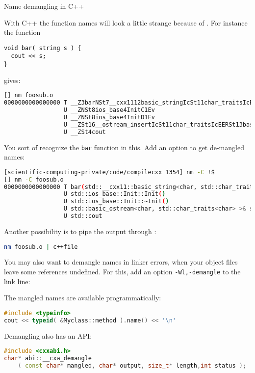  {Name demangling in C++}

With C++ the function names will look a little strange
because of .
For instance the function
\begin{lstlisting}
void bar( string s ) {
  cout << s;
}
\end{lstlisting}
gives:
\begin{lstlisting}[language=bash]
[] nm foosub.o
0000000000000000 T __Z3barNSt7__cxx1112basic_stringIcSt11char_traitsIcESaIcEEE
                 U __ZNSt8ios_base4InitC1Ev
                 U __ZNSt8ios_base4InitD1Ev
                 U __ZSt16__ostream_insertIcSt11char_traitsIcEERSt13basic_ostreamIT_T0_ES6_PKS3_l
                 U __ZSt4cout
\end{lstlisting}
You sort of recognize the \lstinline{bar} function in this.
Add an option  to get de-mangled names:
\begin{lstlisting}[language=bash]
[scientific-computing-private/code/compilecxx 1354] nm -C !$
[] nm -C foosub.o
0000000000000000 T bar(std::__cxx11::basic_string<char, std::char_traits<char>, std::allocator<char> >)
                 U std::ios_base::Init::Init()
                 U std::ios_base::Init::~Init()
                 U std::basic_ostream<char, std::char_traits<char> >& std::__ostream_insert<char, std::char_traits<char> >(std::basic_ostream<char, std::char_traits<char> >&, char const*, long)
                 U std::cout
\end{lstlisting}

Another possibility is to pipe the  output
through :
\begin{lstlisting}[language=bash]
nm foosub.o | c++file
\end{lstlisting}

You may also want to demangle names in linker errors,
when your object files leave some references undefined.
For this, add an option \lstinline+-Wl,-demangle+
to the link line:


The mangled names are available programmatically:
\begin{lstlisting}[language=C++]
#include <typeinfo>
cout << typeid( &Myclass::method ).name() << '\n'
\end{lstlisting}
Demangling also has an \ac{API}:
\begin{lstlisting}[language=C++]
#include <cxxabi.h>
char* abi::__cxa_demangle
    ( const char* mangled, char* output, size_t* length,int status );
\end{lstlisting}


